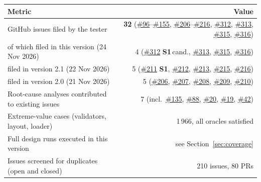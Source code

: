 \documentclass[11pt,a4paper]{article}
\newcommand{\issue}[1]{\href{https://github.com/Nidhikhare12/OsdagBridge/issues/#1}{\##1}}
\newcommand{\sevH}{\textcolor{sevhigh}{\textbf{S1}}}
\begin{document}
\begin{center}
\begin{tabular}{@{}lr@{}}
\toprule
Metric & Value \\
\midrule
GitHub issues filed by the tester & \textbf{32} (\issue{96}--\issue{155}, \issue{206}--\issue{216}, \issue{312}, \issue{313}, \issue{315}, \issue{316}) \\
\quad of which filed in this version (24 Nov 2026) & 4 (\issue{312} \sevH\,cand., \issue{313}, \issue{315}, \issue{316}) \\
\quad filed in version 2.1 (22 Nov 2026) & 5 (\issue{211} \sevH, \issue{212}, \issue{213}, \issue{215}, \issue{216}) \\
\quad filed in version 2.0 (21 Nov 2026) & 5 (\issue{206}, \issue{207}, \issue{208}, \issue{209}, \issue{210}) \\
Root-cause analyses contributed to existing issues & 7 (incl.\ \issue{135}, \issue{88}, \issue{20}, \issue{19}, \issue{42}) \\
Extreme-value cases (validators, layout, loader) & 1\,966, all oracles satisfied \\
Full design runs executed in this version & see Section~\ref{sec:coverage} \\
Issues screened for duplicates (open and closed) & 210 issues, 80 PRs \\
\bottomrule
\end{tabular}
\end{center}
\end{document}
